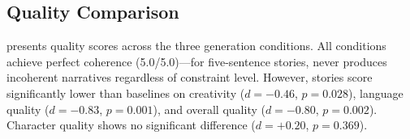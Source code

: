 \subsection{Quality Comparison}
\label{sec:results_quality}

 presents quality scores across the three generation conditions.
All conditions achieve perfect coherence (5.0/5.0)---for five-sentence stories, \gptfour never produces incoherent narratives regardless of constraint level.
However, \compcontrolled stories score significantly lower than \titleonly baselines on creativity ($d{=}{-}0.46$, $p{=}0.028$), language quality ($d{=}{-}0.83$, $p{=}0.001$), and overall quality ($d{=}{-}0.80$, $p{=}0.002$).
Character quality shows no significant difference ($d{=}{+}0.20$, $p{=}0.369$).

\begin{table}[t]
    \centering
    \caption{Quality scores (1--5 scale, mean $\pm$ std) across generation conditions. \compcontrolled stories score significantly lower on creativity, language quality, and overall quality compared to both baselines. Best results per dimension in \textbf{bold}. Statistical significance: $^*p{<}0.05$, $^{**}p{<}0.01$ (Wilcoxon signed-rank, Bonferroni-corrected, \compcontrolled vs.\ \titleonly).}
    \label{tab:quality}
\end{table}


